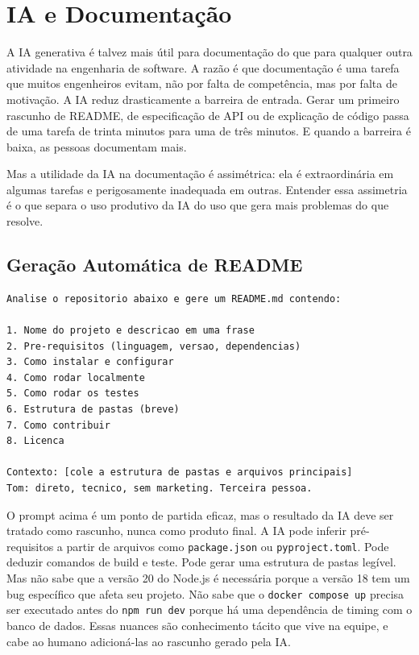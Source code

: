 \section{IA e Documentação}

A IA generativa é talvez mais útil para documentação do que para
qualquer outra atividade na engenharia de software. A razão é que
documentação é uma tarefa que muitos engenheiros evitam, não por
falta de competência, mas por falta de motivação. A IA reduz
drasticamente a barreira de entrada. Gerar um primeiro rascunho de
README, de especificação de API ou de explicação de código passa de
uma tarefa de trinta minutos para uma de três minutos. E quando a
barreira é baixa, as pessoas documentam mais.

Mas a utilidade da IA na documentação é assimétrica: ela é
extraordinária em algumas tarefas e perigosamente inadequada em
outras. Entender essa assimetria é o que separa o uso produtivo da
IA do uso que gera mais problemas do que resolve.


\subsection{Geração Automática de README}

\begin{lstlisting}[language={}, caption={Prompt para Gerar README com IA}]
Analise o repositorio abaixo e gere um README.md contendo:

1. Nome do projeto e descricao em uma frase
2. Pre-requisitos (linguagem, versao, dependencias)
3. Como instalar e configurar
4. Como rodar localmente
5. Como rodar os testes
6. Estrutura de pastas (breve)
7. Como contribuir
8. Licenca

Contexto: [cole a estrutura de pastas e arquivos principais]
Tom: direto, tecnico, sem marketing. Terceira pessoa.
\end{lstlisting}

O prompt acima é um ponto de partida eficaz, mas o resultado da IA deve
ser tratado como rascunho, nunca como produto final. A IA pode inferir
pré-requisitos a partir de arquivos como \texttt{package.json} ou
\texttt{pyproject.toml}. Pode deduzir comandos de build e teste. Pode
gerar uma estrutura de pastas legível. Mas não sabe que a versão 20 do
Node.js é necessária porque a versão 18 tem um bug específico que afeta
seu projeto. Não sabe que o \texttt{docker compose up} precisa ser
executado antes do \texttt{npm run dev} porque há uma dependência de
timing com o banco de dados. Essas nuances são conhecimento tácito que
vive na equipe, e cabe ao humano adicioná-las ao rascunho gerado pela
IA.



